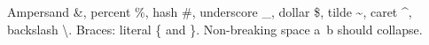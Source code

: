 \documentclass{article}
\begin{document}
Ampersand \&, percent \%, hash \#, underscore \_, dollar \$, tilde \~{}, caret \^{}, backslash \textbackslash{}.
Braces: literal \{ and \}.
Non-breaking space a~b should collapse.
\end{document}
